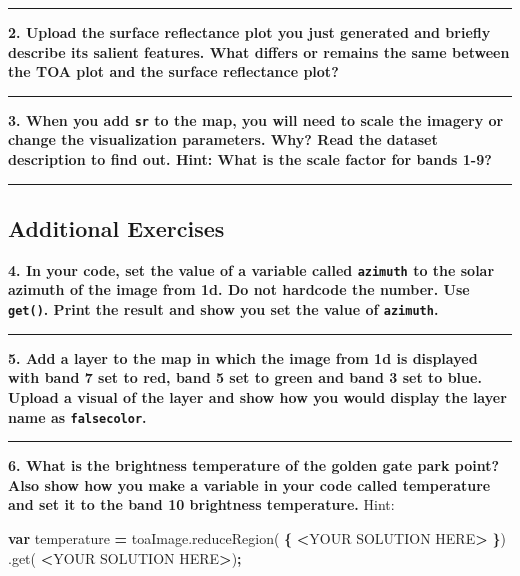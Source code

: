 \documentclass[
]{article}
\newenvironment{Shaded}{\begin{snugshade}}{\end{snugshade}}
\newcommand{\AttributeTok}[1]{\textcolor[rgb]{0.77,0.63,0.00}{#1}}
\newcommand{\KeywordTok}[1]{\textcolor[rgb]{0.13,0.29,0.53}{\textbf{#1}}}
\newcommand{\NormalTok}[1]{#1}
\newcommand{\OperatorTok}[1]{\textcolor[rgb]{0.81,0.36,0.00}{\textbf{#1}}}
\newcommand{\VariableTok}[1]{\textcolor[rgb]{0.00,0.00,0.00}{#1}}
\begin{document}
\begin{center}\rule{0.5\linewidth}{0.5pt}\end{center}

\textbf{2. Upload the surface reflectance plot you just generated and briefly describe its salient features. What differs or remains the same between the TOA plot and the surface reflectance plot? }

\begin{center}\rule{0.5\linewidth}{0.5pt}\end{center}

\textbf{3. When you add \texttt{sr} to the map, you will need to scale the imagery or change the visualization parameters. Why? Read the dataset description to find out. Hint: What is the scale factor for bands 1-9? }

\begin{center}\rule{0.5\linewidth}{0.5pt}\end{center}

\hypertarget{additional-exercises-1}{%
\subsection{Additional Exercises}\label{additional-exercises-1}}

\textbf{4. In your code, set the value of a variable called \texttt{azimuth} to the solar azimuth of the image from 1d. Do not hardcode the number. Use \texttt{get()}. Print the result and show you set the value of \texttt{azimuth}.}

\begin{center}\rule{0.5\linewidth}{0.5pt}\end{center}

\textbf{5. Add a layer to the map in which the image from 1d is displayed with band 7 set to red, band 5 set to green and band 3 set to blue. Upload a visual of the layer and show how you would display the layer name as \texttt{falsecolor}. }

\begin{center}\rule{0.5\linewidth}{0.5pt}\end{center}

\textbf{6. What is the brightness temperature of the golden gate park point? Also show how you make a variable in your code called temperature and set it to the band 10 brightness temperature.} Hint:

\begin{Shaded}
\begin{Highlighting}[]
\KeywordTok{var}\NormalTok{  temperature }\OperatorTok{=} \VariableTok{toaImage}\NormalTok{.}\AttributeTok{reduceRegion}\NormalTok{(}
  \OperatorTok{\{} \OperatorTok{<}\NormalTok{YOUR SOLUTION HERE}\OperatorTok{>}   \OperatorTok{\}}\NormalTok{)}
\NormalTok{        .}\AttributeTok{get}\NormalTok{(  }\OperatorTok{<}\NormalTok{YOUR SOLUTION  HERE}\OperatorTok{>}\NormalTok{)}\OperatorTok{;}  
\end{Highlighting}
\end{Shaded}
\end{document}
